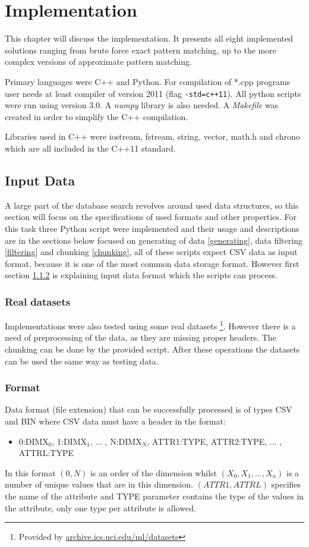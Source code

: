 \chapter{Implementation}
This chapter will discuss the implementation. It presents all eight implemented solutions ranging from brute force exact pattern matching, up to the more complex versions of approximate pattern matching. 

Primary languages were C++ and Python. For compilation of *.cpp programs user needs at least compiler of version 2011 (flag \texttt{-std=c++11}). All python scripts were run using version 3.0. A \textit{numpy} library is also needed. A \textit{Makefile} was created in order to simplify the C++ compilation.

Libraries used in C++ were iostream, fstream, string, vector, math.h and chrono which are all included in the C++11 standard.

\section{Input Data}
A large part of the database search revolves around used data structures, so this section will focus on the specifications of used formats and other properties. For this task three Python script were implemented and their usage and descriptions are in the sections below focused on generating of data \ref{generating}, data filtering \ref{filtering} and chunking \ref{chunking}, all of these scripts expect CSV data as input format, because it is one of the most common data storage format. However first section \ref{format} is explaining input data format which the scripts can process.

\subsection{Real datasets}
Implementations were also tested using some real datasets \footnote{Provided by \url{archive.ics.uci.edu/ml/datasets}}. However there is a need of preprocessing of the data, as they are missing proper headers. The chunking can be done by the provided script. After these operations the datasets can be used the same way as testing data.

\subsection{Format}\label{format}
Data format (file extension) that can be successfully processed is of types CSV and BIN where CSV data must have a header in the format:
\begin{itemize}
\item 0:DIMX$_0$, 1:DIMX$_1$, ... , N:DIMX$_N$, ATTR1:TYPE, ATTR2:TYPE, ... , ATTRL:TYPE
\end{itemize}
In this format $(0, N)$ is an order of the dimension whilst $(X_0, X_1, ... , X_n)$ is a number of unique values that are in this dimension. $(ATTR1, ATTRL)$ specifies the name of the attribute and TYPE parameter contains the type of the values in the attribute, only one type per attribute is allowed. 

